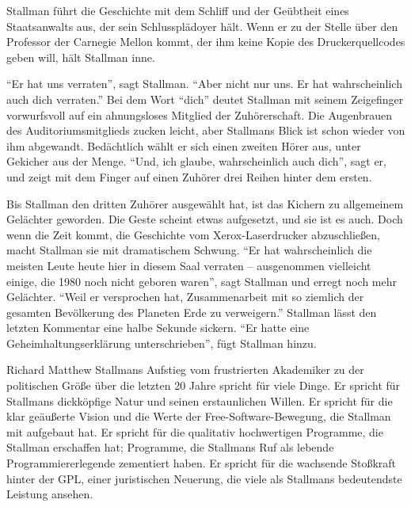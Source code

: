 Stallman führt die Geschichte mit dem Schliff und der Geübtheit eines Staatsanwalts aus, der sein Schlussplädoyer hält. Wenn er zu der Stelle über den Professor der Carnegie Mellon kommt, der ihm keine Kopie des Druckerquellcodes geben will, hält Stallman inne.

"`Er hat uns verraten"', sagt Stallman. "`Aber nicht nur uns. Er hat wahrscheinlich auch dich verraten."'
Bei dem Wort "`dich"' deutet Stallman mit seinem Zeigefinger vorwurfsvoll auf ein ahnungsloses Mitglied der Zuhörerschaft. Die Augenbrauen des Auditoriumsmitglieds zucken leicht, aber Stallmans Blick ist schon wieder von ihm abgewandt. Bedächtlich wählt er sich einen zweiten Hörer aus, unter Gekicher aus der Menge. "`Und, ich glaube, wahrscheinlich auch dich"', sagt er, und zeigt mit dem Finger auf einen Zuhörer drei Reihen hinter dem ersten.

Bis Stallman den dritten Zuhörer ausgewählt hat, ist das Kichern zu allgemeinem Gelächter geworden. Die Geste scheint etwas aufgesetzt, und sie ist es auch. Doch wenn die Zeit kommt, die Geschichte vom Xerox-Laserdrucker abzuschließen, macht Stallman sie mit dramatischem Schwung. "`Er hat wahrscheinlich die meisten Leute heute hier in diesem Saal verraten – ausgenommen vielleicht einige, die 1980 noch nicht geboren waren"', sagt Stallman und erregt noch mehr Gelächter. "`Weil er versprochen hat, Zusammenarbeit mit so ziemlich der gesamten Bevölkerung des Planeten Erde zu verweigern."' Stallman lässt den letzten Kommentar eine halbe Sekunde sickern. "`Er hatte eine Geheimhaltungserklärung unterschrieben"', fügt Stallman hinzu.

Richard Matthew Stallmans Aufstieg vom frustrierten Akademiker zu der politischen Größe über die letzten 20 Jahre spricht für viele Dinge. Er spricht für Stallmans dickköpfige Natur und seinen erstaunlichen Willen. Er spricht für die klar geäußerte Vision und die Werte der Free-Software-Bewegung, die Stallman mit aufgebaut hat. Er spricht für die qualitativ hochwertigen Programme, die Stallman erschaffen hat; Programme, die Stallmans Ruf als lebende Programmiererlegende zementiert haben. Er spricht für die wachsende Stoßkraft hinter der GPL, einer juristischen Neuerung, die viele als Stallmans bedeutendste Leistung ansehen.

